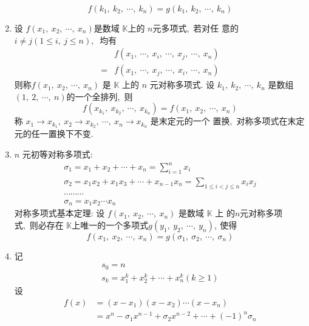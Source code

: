 \begin{enumerate}
		$$f\left(k_{1},\  k_{2},\  \cdots,\  k_{n}\right)=g\left(k_{1},\  k_{2},\  \cdots,\  k_{n}\right)$$
		\item 设 $ f\left(x_{1},\  x_{2},\  \cdots,\  x_{n}\right)  $是数域  $\mathbb{K}  $上的 $ n  $元多项式,\  若对任 意的  $i \neq j(1 \leqslant i,\  j \leqslant n) ,\ $ 均有
		$$\begin{aligned}
			& f\left(x_{1},\  \cdots,\  x_{i},\  \cdots,\  x_{j},\  \cdots,\  x_{n}\right) \\
			=& f\left(x_{1},\  \cdots,\  x_{j},\  \cdots,\  x_{i},\  \cdots,\  x_{n}\right)
		\end{aligned}$$
		则称$  f\left(x_{1},\  x_{2},\  \cdots,\  x_{n}\right) $ 是  $\mathbb{K} $ 上的 $ n $ 元对称多项式.
		设 $ k_{1},\  k_{2},\  \cdots,\  k_{n} $ 是数组  $(1,\ 2,\  \cdots,\  n)  $的一个全排列,\  则
		$$f\left(x_{k_{1}},\  x_{k_{2}},\  \cdots,\  x_{k_{n}}\right)=f\left(x_{1},\  x_{2},\  \cdots,\  x_{n}\right)$$
		称 $ x_{1} \rightarrow x_{k_{1}},\  x_{2} \rightarrow x_{k_{2}},\  \cdots,\  x_{n} \rightarrow x_{k_{n}} $ 是末定元的一个 置换,\  对称多项式在末定元的任一置换下不变.
		\item  $n$  元初等对称多项式:
		$$\begin{array}{l}
			\sigma_{1}=x_{1}+x_{2}+\cdots+x_{n}=\sum\limits_{i=1}^{n} x_{i} \\
			\sigma_{2}=x_{1} x_{2}+x_{1} x_{3}+\cdots+x_{n-1} x_{n}=\sum\limits_{1 \leqslant i<j \leqslant n} x_{i} x_{j}\\
			\cdots\cdots\cdots\\
			\sigma_{n}=x_{1} x_{2} \cdots x_{n}
		\end{array}$$
		对称多项式基本定理: 设  $f\left(x_{1},\  x_{2},\  \cdots,\  x_{n}\right) $ 是数域 $ \mathbb{K}$  上 的$  n  $元对称多项式,\  则必存在 $ \mathbb{K}  $上唯一的一个多项式$ g\left(y_{1},\  y_{2},\  \cdots,\  y_{n}\right) ,\  $使得
		$$f\left(x_{1},\  x_{2},\  \cdots,\  x_{n}\right)=g\left(\sigma_{1},\  \sigma_{2},\  \cdots,\  \sigma_{n}\right)$$
		\item 记
		$$\begin{array}{l}
			s_{0}=n \\
			s_{k}=x_{1}^{k}+x_{2}^{k}+\cdots+x_{n}^{k}(k \geqslant 1)
		\end{array}$$
		设
		$$\begin{aligned}
			f(x) &=\left(x-x_{1}\right)\left(x-x_{2}\right) \cdots\left(x-x_{n}\right) \\
			&=x^{n}-\sigma_{1} x^{n-1}+\sigma_{2} x^{n-2}+\cdots+(-1)^{n} \sigma_{n}
		\end{aligned}$$

\end{enumerate}
